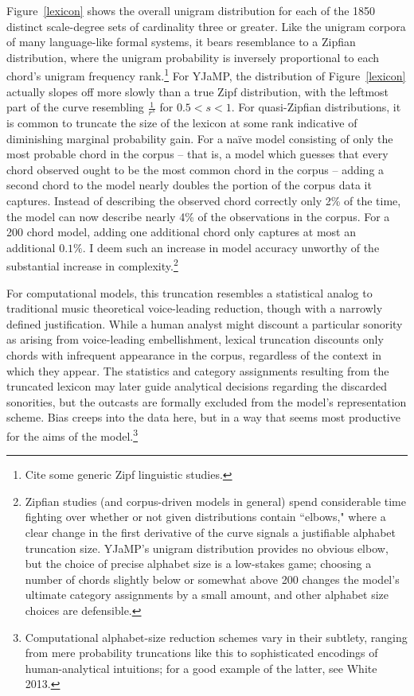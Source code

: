 Figure~\ref{lexicon} shows the overall unigram distribution for each of the 1850 distinct scale-degree sets of cardinality three or greater.  Like the unigram corpora of many language-like formal systems, it bears resemblance to a Zipfian distribution, where the unigram probability is inversely proportional to each chord's unigram frequency rank.\footnote{Cite some generic Zipf linguistic studies.}  For YJaMP, the distribution of Figure~\ref{lexicon} actually slopes off more slowly than a true Zipf distribution, with the leftmost part of the curve resembling $\frac{1}{r^s}$ for $0.5 < s < 1$.  For quasi-Zipfian distributions, it is common to truncate the size of the lexicon at some rank indicative of diminishing marginal probability gain. For a na\"{i}ve model consisting of only the most probable chord in the corpus -- that is, a model which guesses that every chord observed ought to be the most common chord in the corpus -- adding a second chord to the model nearly doubles the portion of the corpus data it captures.  Instead of describing the observed chord correctly only 2\% of the time, the model can now describe nearly 4\% of the observations in the corpus.  For a 200 chord model, adding one additional chord only captures at most an additional $0.1\%$.  I deem such an increase in model accuracy unworthy of the substantial increase in complexity.\footnote{Zipfian studies (and corpus-driven models in general) spend considerable time fighting over whether or not given distributions contain ``elbows," where a clear change in the first derivative of the curve signals a justifiable alphabet truncation size.  YJaMP's unigram distribution provides no obvious elbow, but the choice of precise alphabet size is a low-stakes game; choosing a number of chords slightly below or somewhat above 200 changes the model's ultimate category assignments by a small amount, and other alphabet size choices are defensible.}

For computational models, this truncation resembles a statistical analog to traditional music theoretical  voice-leading reduction, though with a narrowly defined justification.  While a human analyst might discount a particular sonority as arising from voice-leading embellishment, lexical truncation discounts only chords with infrequent appearance in the corpus, regardless of the context in which they appear.  The statistics and category assignments resulting from the truncated lexicon may later guide analytical decisions regarding the discarded sonorities, but the outcasts are formally excluded from the model's representation scheme.  Bias creeps into the data here, but in a way that seems most productive for the aims of the model.\footnote{Computational alphabet-size reduction schemes vary in their subtlety, ranging from mere probability truncations like this to sophisticated encodings of human-analytical intuitions; for a good example of the latter, see White 2013.}

